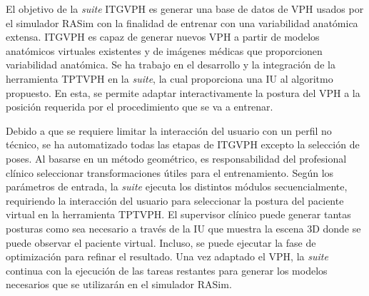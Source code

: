 
El objetivo de la \emph{suite} \ac{ITGVPH} es generar una base de datos de \ac{VPH} usados por el simulador \ac{RASim} con la finalidad de entrenar con una variabilidad anatómica extensa.
\ac{ITGVPH} es capaz de generar nuevos \ac{VPH} a partir de modelos anatómicos virtuales existentes y de imágenes médicas que proporcionen variabilidad anatómica.  
Se ha trabajo en el desarrollo y la integración de la herramienta \ac{TPTVPH} en la \emph{suite}, la cual proporciona una \ac{IU} al algoritmo propuesto. En esta, se permite adaptar interactivamente la postura del \ac{VPH} a la posición requerida por el procedimiento que se va a entrenar.
 


Debido a que se requiere limitar la interacción del usuario con un perfil no técnico, se ha automatizado todas las etapas de \ac{ITGVPH} excepto la selección de poses. Al basarse en un método geométrico, es responsabilidad del profesional clínico seleccionar transformaciones útiles para el entrenamiento.   Según los parámetros de entrada, la \emph{suite} ejecuta los distintos módulos secuencialmente, requiriendo la interacción del usuario para seleccionar la postura del paciente virtual en la herramienta \ac{TPTVPH}. El supervisor clínico puede generar tantas posturas como sea necesario a través de la \ac{IU} que muestra la escena 3D donde se puede observar el paciente virtual. Incluso, se puede ejecutar la fase de optimización para refinar el resultado. Una vez adaptado el \ac{VPH}, la \emph{suite} continua con la ejecución de las tareas restantes para generar los modelos necesarios que se utilizarán en el simulador \ac{RASim}.


